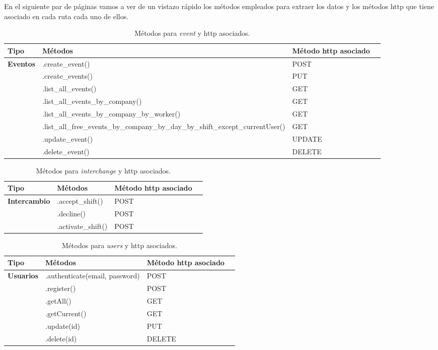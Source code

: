 \begin{itemize}
En el siguiente par de páginas vamos a ver de un vistazo rápido los métodos empleados para extraer los datos y los métodos http que tiene asociado en cada ruta cada uno de ellos. 
\begin{landscape}
\begin{table}[H]
\centering
\begin{tabular}{|l|l|l|l|}
\hline
Tipo  & Métodos & Método http asociado \\
\hline \hline
\textbf{Eventos} & .create\_event()  & POST \\ \hline
    & .create\_events()  &  PUT \\ \hline
    & .list\_all\_events()  & GET \\ \hline
    & .list\_all\_events\_by\_company()  &  GET\\ \hline
    & .list\_all\_events\_by\_company\_by\_worker() & GET \\ \hline
    & .list\_all\_free\_events\_by\_company\_by\_day\_by\_shift\_except\_currentUser() & GET\\ \hline
    & .update\_event()  & UPDATE \\ \hline
    & .delete\_event() & DELETE \\ \hline
    \hline \hline
\end{tabular}
\caption{Métodos para \emph{event} y http asociados.}
\end{table}

\begin{table}[H]
\centering
\begin{tabular}{|l|l|l|l|}
\hline
Tipo  & Métodos & Método http asociado \\
\hline \hline
\textbf{Intercambio} & .accept\_shift()  & POST \\ \hline
    & .decline()  & POST  \\ \hline
    & .activate\_shift()  &  POST \\ \hline
    \hline \hline
\end{tabular}
\caption{Métodos para \emph{interchange} y http asociados.}
\end{table}


\begin{table}[H]
\centering
\begin{tabular}{|l|l|l|l|}
\hline
Tipo  & Métodos & Método http asociado \\
\hline \hline
\textbf{Usuarios} & .authenticate(email, password)  & POST \\ \hline
    & .register()  & POST \\ \hline
    & .getAll()  &  GET\\ \hline
    & .getCurrent()  &  GET\\ \hline
    & .update(id)  &  PUT \\ \hline
    & .delete(id)  & DELETE \\ \hline
    \hline \hline
\end{tabular}
\caption{Métodos para \emph{users} y http asociados.}
\end{table}


\end{landscape}
\end{itemize}
